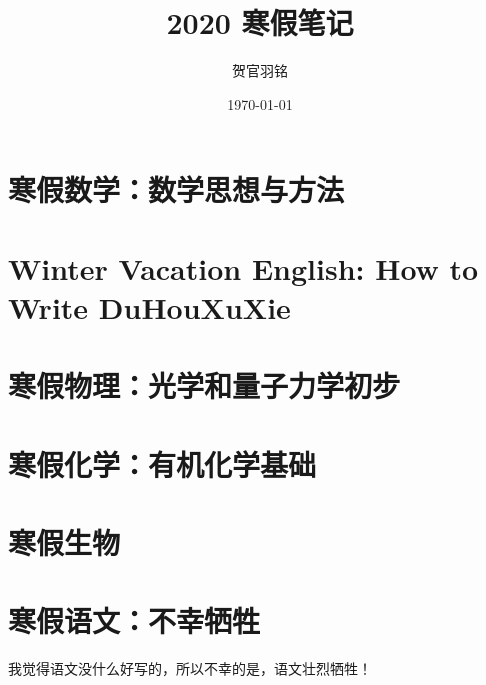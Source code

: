 \documentclass[UTF8]{ctexart}
\author{贺官羽铭}
\date{\today}
\title{2020 寒假笔记}
\begin{document}
\pagestyle{plain}
\maketitle

\newpage
{}


\newpage
\tableofcontents

\newpage


\newpage
\pagestyle{fancy}

\part{寒假数学：数学思想与方法}


\newpage
\part{Winter Vacation English: How to Write DuHouXuXie}


\newpage
\part{寒假物理：光学和量子力学初步}


\newpage
\part{寒假化学：有机化学基础}


\newpage
\part{寒假生物}


\newpage
\part{寒假语文：不幸牺牲}
我觉得语文没什么好写的，所以不幸的是，语文壮烈牺牲！

\newpage



\newpage
\listoffigures

\vspace{3cm}
\listoftables
\end{document}
